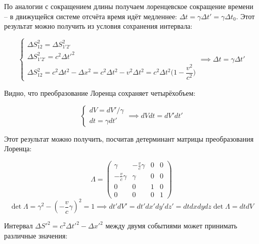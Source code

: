 \documentclass{article}
\begin{document}
По аналогии с сокращением длины получаем лоренцевское сокращение времени -- в движущейся системе отсчёта время идёт медленнее: $\Delta t=\gamma\Delta t'=\gamma\Delta t_0$. Этот результат можно получить из условия сохранения интервала:

\begin{equation*}
    \begin{cases}
    \Delta S_{12}^2=\Delta S_{1'2'}^2\\
    \Delta S_{1'2'}^2=c^2\Delta t'^2\\
    \Delta S_{12}^2=c^2\Delta t^2-\Delta x^2=c^2\Delta t^2-v^2\Delta t^2=c^2\Delta t^2\big(1-\dfrac{v^2}{c^2}\big)
    \end{cases}
    \implies \Delta t=\gamma\Delta t'
\end{equation*}

Видно, что преобразование Лоренца сохраняет четырёхобъем:

\begin{equation*}
    \begin{cases}
    dV=dV'/\gamma\\
    dt=\gamma dt'
    \end{cases}
    \implies dVdt=dV'dt'
\end{equation*}

Этот результат можно получить, посчитав детерминант матрицы преобразования Лоренца:

\begin{equation*}
    \Lambda =
    \begin{pmatrix}
        \gamma & -\frac{v}{c}\gamma & 0 & 0 \\
        -\frac{v}{c}\gamma & \gamma & 0 & 0 \\
        0 & 0 & 1 & 0 \\
        0 & 0 & 0 & 1
    \end{pmatrix}
\end{equation*}
\begin{equation*}
    \det \Lambda = \gamma^2-\left(-\frac{v}{c}\gamma\right)^2=1
    \implies dt'dV'=dt'dx'dy'dz'=dtdxdydz\det\Lambda=dtdV
\end{equation*}

Интервал $\Delta S'^2=c^2\Delta t'^2-\Delta x'^2$ между двумя событиями может принимать различные значения:
\end{document}
